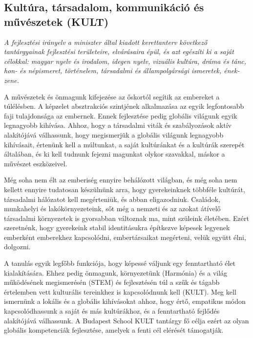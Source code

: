 \subsection[KULT]{Kultúra, társadalom, kommunikáció és művészetek (KULT)}
\emph{A fejlesztési irányelv a miniszter által kiadott kerettanterv következő tantárgyainak fejlesztési területeire, elvárásaira épül, és azt egészíti ki a saját célokkal: magyar nyelv és irodalom, idegen nyelv, vizuális kultúra, dráma és tánc, hon- és népismeret, történelem, társadalmi és állampolgársági ismeretek, ének-zene.}

A művészetek és önmagunk kifejezése az őskortól segítik az embereket a túlélésben. A képzelet absztrakciós szintjének alkalmazása az egyik legfontosabb faji tulajdonsága az embernek. Ennek fejlesztése pedig globális világunk egyik legnagyobb kihívása. Ahhoz, hogy a társadalmi viták és szabályozások aktív alakítójává válhassunk, hogy megismerjük a globális világunk legnagyobb kihívásait, értenünk kell a múltunkat, a saját kultúránkat és a kultúrák szerepét általában, és ki kell tudnunk fejezni magunkat olykor szavakkal, máskor a művészet eszközeivel.

Még soha nem élt az emberiség ennyire behálózott világban, és még soha nem kellett ennyire tudatosan készülnünk arra, hogy gyerekeinknek többféle kultúrát, társadalmi hálózatot kell megérteniük, és abban eligazodniuk. Családok, munkahelyi és lakókörnyezeteink, sőt még a nemzeti és az azokat átívelő társadalmi környezetek is gyorsabban változnak ma, mint szüleink életében. Ezért szeretnénk, hogy gyerekeink stabil identitásukra építkezve képesek legyenek emberként emberekhez kapcsolódni, embertársaikat megérteni, velük együtt élni, dolgozni.

A tanulás egyik legfőbb funkciója, hogy képessé váljunk egy fenntartható élet kialakítására. Ehhez pedig önmagunk, környezetünk (Harmónia) és a világ működésének megismerésén (STEM) és fejlesztésén túl a szűk és tágabb értelemben vett kulturális tereinkhez is kapcsolódnunk kell (KULT). Meg kell ismernünk a lokális és a globális kihívásokat ahhoz, hogy értő, empatikus módon kapcsolódhassunk a saját és más kultúrákhoz, és a fenntartható fejlődés alakítójává válhassunk. A Budapest School KULT tantárgy fő célja ezért az olyan globális kompetenciák fejlesztése, amelyek a fenti cél elérését támogatják.

